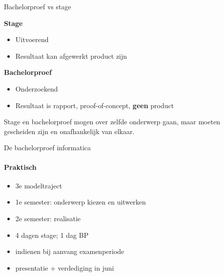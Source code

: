 \documentclass[usenames,dvipsnames]{beamer}
\begin{document}
\begin{frame}{Bachelorproef vs stage}

  \begin{multicols}{2}
    \textbf{Stage}
    
    \begin{itemize}
      \item Uitvoerend
      \item Resultaat kan afgewerkt product zijn
    \end{itemize}
    
    \columnbreak
    
    \textbf{Bachelorproef}
    
    \begin{itemize}
      \item Onderzoekend
      \item Resultaat is rapport, proof-of-concept, \textbf{geen} product
    \end{itemize}
  \end{multicols}

Stage en bachelorproef mogen over zelfde onderwerp gaan, maar moeten gescheiden zijn en onafhankelijk van elkaar.

\end{frame}

\begin{frame}{De bachelorproef informatica}
  \framesubtitle{Praktisch}
  
  \begin{itemize}
    \item 3e modeltraject
    \item 1e semester: onderwerp kiezen en uitwerken
    \item 2e semester: realisatie
    \item 4 dagen stage; 1 dag BP
    \item indienen bij aanvang examenperiode
    \item presentatie + verdediging in juni
  \end{itemize}

\end{frame}
\end{document}
